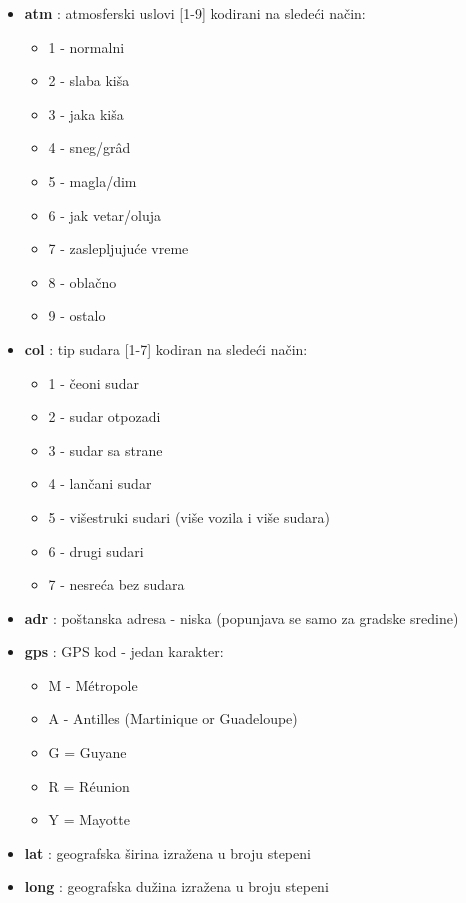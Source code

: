 \documentclass[a4paper,10pt]{article}
\begin{document}
\begin{itemize}
\begin{itemize}
\begin{itemize}
			\end{itemize}

  \item \textbf{atm} : atmosferski uslovi [1-9] kodirani na sledeći način:
			\begin{itemize}
			 \item 1 - normalni
			 \item 2 - slaba kiša
			 \item 3 - jaka kiša 
			 \item 4 - sneg/gr\^ad
			 \item 5 - magla/dim
			 \item 6 - jak vetar/oluja
			 \item 7 - zaslepljujuće vreme %
			 \item 8 - oblačno
			 \item 9 - ostalo
			\end{itemize}
			
  \item \textbf{col} : tip sudara [1-7] kodiran na sledeći način:
			\begin{itemize}
			 \item 1 - čeoni sudar
			 \item 2 - sudar otpozadi
			 \item 3 - sudar sa strane
			 \item 4 - lančani sudar
			 \item 5 - višestruki sudari (više vozila i više sudara)
			 \item 6 - drugi sudari
			 \item 7 - nesreća bez sudara
			\end{itemize}
  
  \item \textbf{adr} : poštanska adresa - niska (popunjava se samo za gradske sredine)
  \item \textbf{gps} : GPS kod - jedan karakter:
			\begin{itemize}
			 \item M - Métropole
			 \item A - Antilles (Martinique or Guadeloupe)
			 \item G = Guyane
			 \item R = Réunion
			 \item Y = Mayotte
			\end{itemize}
			
  \item \textbf{lat} : geografska širina izražena u broju stepeni
  \item \textbf{long} : geografska dužina izražena u broju stepeni




\end{itemize}
\end{itemize}
\end{document}
